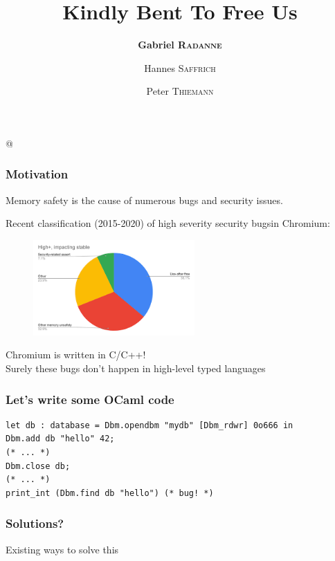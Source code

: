 \documentclass[aspectratio=169,dvipsnames,svgnames,10pt]{beamer}
\title{Kindly Bent To Free Us}
\author{\textbf{Gabriel \textsc{Radanne}}
  \and Hannes \textsc{Saffrich}
  \and Peter \textsc{Thiemann}}
\begin{document}
\lstMakeShortInline[keepspaces,basicstyle=\small\ttfamily]@

\frame[plain]{\titlepage}


\begin{frame}
  \frametitle{Motivation}

  Memory safety is the cause of numerous bugs and security issues.
  
  Recent classification (2015-2020) of \og high severity security bugs\fg in Chromium:

  \begin{figure}[h]
    \centering
    \includegraphics[width=0.55\textwidth]
    {chromium-use-after-free}
  \end{figure}

  \pause
  Chromium is written in C/C++!\\
  Surely these bugs don't happen in high-level typed languages
  
\end{frame}

\begin{frame}[fragile]
  \frametitle{Let's write some OCaml code}

\begin{verbatim}
let db : database = Dbm.opendbm "mydb" [Dbm_rdwr] 0o666 in
Dbm.add db "hello" 42;
(* ... *)
Dbm.close db;
(* ... *)
print_int (Dbm.find db "hello") (* bug! *)
\end{verbatim}
  
\end{frame}

\begin{frame}
  \frametitle{Solutions?}

  Existing ways to solve this
  
\end{frame}
\end{document}

